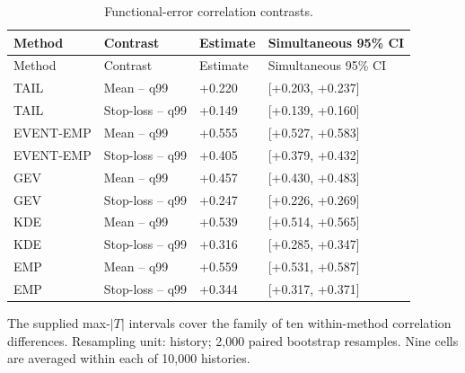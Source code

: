 \begingroup
\fontsize{8.5}{10.5}\selectfont\setlength{\tabcolsep}{3pt}
\begin{longtable}{@{}llll@{}}
\caption{Functional-error correlation contrasts.}\label{tab:final-si-7}\\
\toprule
Method & Contrast & Estimate & Simultaneous 95\% CI\\\midrule\endfirsthead
Method & Contrast & Estimate & Simultaneous 95\% CI\\\midrule\endhead
TAIL & Mean -- q99 & +0.220 & [+0.203, +0.237]\\
TAIL & Stop-loss -- q99 & +0.149 & [+0.139, +0.160]\\
EVENT-EMP & Mean -- q99 & +0.555 & [+0.527, +0.583]\\
EVENT-EMP & Stop-loss -- q99 & +0.405 & [+0.379, +0.432]\\
GEV & Mean -- q99 & +0.457 & [+0.430, +0.483]\\
GEV & Stop-loss -- q99 & +0.247 & [+0.226, +0.269]\\
KDE & Mean -- q99 & +0.539 & [+0.514, +0.565]\\
KDE & Stop-loss -- q99 & +0.316 & [+0.285, +0.347]\\
EMP & Mean -- q99 & +0.559 & [+0.531, +0.587]\\
EMP & Stop-loss -- q99 & +0.344 & [+0.317, +0.371]\\
\bottomrule
\end{longtable}
\noindent\footnotesize The supplied max-$|T|$ intervals cover the family of ten within-method correlation differences. Resampling unit: history; 2,000 paired bootstrap resamples. Nine cells are averaged within each of 10,000 histories.
\endgroup
